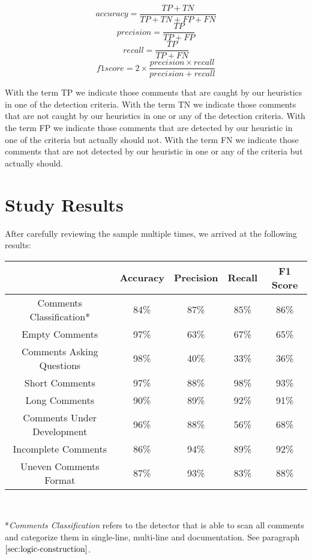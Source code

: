 \begin{equation*}
	accuracy = \frac{TP + TN}{TP + TN + FP + FN}		
\end{equation*}
\begin{equation*}
	precision = \frac{TP}{TP + FP}
\end{equation*}
\begin{equation*}
	recall = \frac{TP}{TP + FN}
\end{equation*}
\begin{equation*}
	f1score = 2 \times \frac{precision \times recall}{precision + recall}
\end{equation*}

\noindent With the term TP we indicate those comments that are caught by our heuristics in one of the detection criteria. With the term TN we indicate those comments that are not caught by our heuristics in one or any of the detection criteria. With the term FP we indicate those comments that are detected by our heuristic in one of the criteria but actually should not. With the term FN we indicate those comments that are not detected by our heuristic in one or any of the criteria but actually should.

\section{Study Results}
After carefully reviewing the sample multiple times, we arrived at the following results:

\begin{center}
	\begin{tabular}{|c|c|c|c|c|}
		\hline
		& \textbf{Accuracy} & \textbf{Precision} & \textbf{Recall} & \textbf{F1 Score} \\
		\hline Comments Classification*    & 84\%     & 87\%      & 85\%   & 86\%    \\
		\hline Empty Comments             & 97\%     & 63\%      & 67\%   & 65\%    \\
		\hline Comments Asking Questions  & 98\%     & 40\%      & 33\%   & 36\%    \\
		\hline Short Comments             & 97\%     & 88\%      & 98\%   & 93\%    \\
		\hline Long Comments              & 90\%     & 89\%      & 92\%   & 91\%    \\
		\hline Comments Under Development & 96\%     & 88\%      & 56\%   & 68\%    \\
		\hline Incomplete Comments        & 86\%     & 94\%      & 89\%   & 92\%    \\
		\hline Uneven Comments Format     & 87\%     & 93\%      & 83\%   & 88\%   \\
		\hline
	\end{tabular}
	
	\textit{\\}
	
	*\textit{Comments Classification} refers to the detector that is able to scan all comments and categorize them in single-line, multi-line and documentation. See paragraph $\ref{sec:logic-construction}$.
\end{center}

